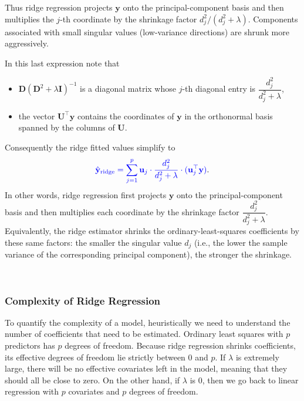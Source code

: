 \documentclass[
]{book}
\begin{document}
Thus ridge regression projects \(\mathbf{y}\) onto the principal-component basis and then multiplies the \(j\)-th coordinate by the shrinkage factor \(d_j^2/(d_j^2+\lambda)\). Components associated with small singular values (low-variance directions) are shrunk more aggressively.

In this last expression note that

\begin{itemize}
\item
  \(\mathbf{D}(\mathbf{D}^2+\lambda\mathbf{I})^{-1}\) is a diagonal matrix whose \(j\)-th diagonal entry is \(\dfrac{d_j^2}{d_j^2+\lambda}\),
\item
  the vector \(\mathbf{U}^\top\mathbf{y}\) contains the coordinates of \(\mathbf{y}\) in the orthonormal basis spanned by the columns of \(\mathbf{U}\).
\end{itemize}

Consequently the ridge fitted values simplify to
\[
{\color{blue}{\hat{\mathbf{y}}_{\text{ridge}}
= \sum_{j=1}^{p}\mathbf{u}_j\cdot\frac{d_j^2}{d_j^2+\lambda}\cdot(\mathbf{u}_j^\top\mathbf{y})}}.
\]
In other words, ridge regression first projects \(\mathbf{y}\) onto the principal-component basis and then multiplies each coordinate by the shrinkage factor \(\dfrac{d_j^2}{d_j^2+\lambda}\). Equivalently, the ridge estimator shrinks the ordinary-least-squares coefficients by these same factors: the smaller the singular value \(d_j\) (i.e., the lower the sample variance of the corresponding principal component), the stronger the shrinkage.

~

\subsubsection*{Complexity of Ridge Regression}\label{complexity-of-ridge-regression}

To quantify the complexity of a model, heuristically we need to understand the number of coefficients that need to be estimated. Ordinary least squares with \(p\) predictors has \(p\) degrees of freedom. Because ridge regression shrinks coefficients, its effective degrees of freedom lie strictly between \(0\) and \(p\). If \(\lambda\) is extremely large, there will be no effective covariates left in the model, meaning that they should all be close to zero. On the other hand, if \(\lambda\) is 0, then we go back to linear regression with \(p\) covariates and \(p\) degrees of freedom.
\end{document}
